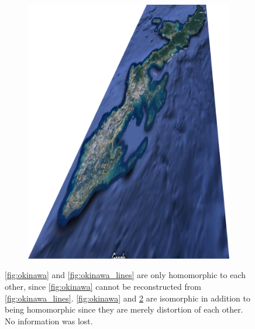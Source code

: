 \begin{figure}
\begin{subfigure}{.25\textwidth}
    \includegraphics[width=\textwidth]{pics/okinawa_distort.png}
    \caption{}
    \label{fig:okinawa_distort}
  \end{subfigure}
  \caption{\ref{fig:okinawa} and \ref{fig:okinawa_lines} are only homomorphic to each other, since \ref{fig:okinawa} cannot be reconstructed from \ref{fig:okinawa_lines}.  \ref{fig:okinawa} and \ref{fig:okinawa_distort} are isomorphic in addition to being homomorphic since they are merely distortion of each other.  No information was lost.  }
\end{figure}
